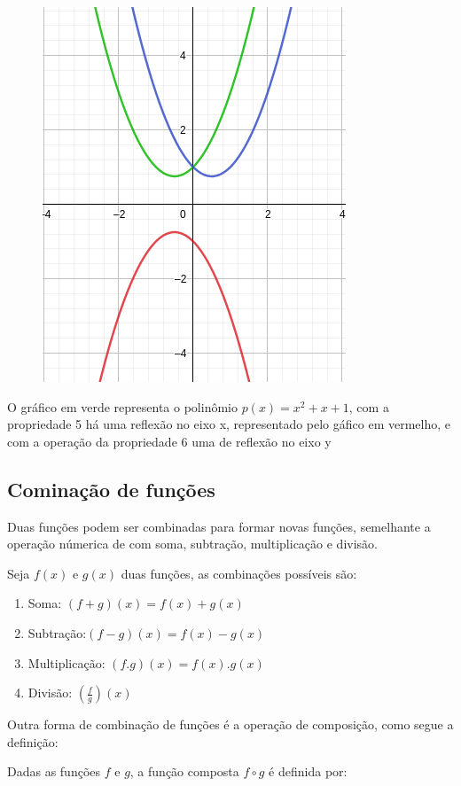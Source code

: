 \begin{multicols*}{2}
\begin{figure}[H]
        \includegraphics[scale=0.35]{assets/rafael/img11.png}
    \end{figure}
    O gráfico em verde representa o polinômio $p(x) = x^2 + x +1$, com a propriedade 5 há uma 				reflexão no eixo x, representado pelo gáfico em vermelho, e com a operação da propriedade 6 uma 		de reflexão no eixo y


    \subsection*{Cominação de funções}
    Duas funções podem ser combinadas para formar novas funções, semelhante a operação númerica de 			com soma, subtração, multiplicação e divisão.

    Seja $f(x)$ e $g(x)$ duas funções, as combinações possíveis são:
    \begin{enumerate}
        \item Soma: $(f+g)(x) = f(x) + g(x)$
        \item Subtração:$(f-g)(x) = f(x) - g(x)$
        \item Multiplicação: $(f.g)(x) = f(x).g(x)$
        \item Divisão: $\left( \frac{f}{g} \right)(x)$
    \end{enumerate}

    Outra forma de combinação de funções é a operação de composição, como segue a definição:

    \begin{theorem}
        Dadas as funções $f$ e $g$, a função composta $f \circ g$ é definida por:


\end{theorem}
\end{multicols*}
